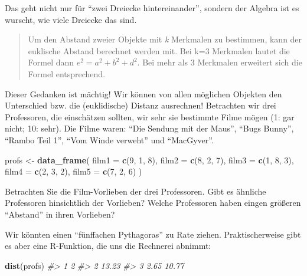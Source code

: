 \documentclass[12pt,ngerman,]{book}
\makeatletter
\newenvironment{Shaded}{\begin{snugshade}}{\end{snugshade}}
\newcommand{\KeywordTok}[1]{\textcolor[rgb]{0.13,0.29,0.53}{\textbf{{#1}}}}
\newcommand{\DataTypeTok}[1]{\textcolor[rgb]{0.13,0.29,0.53}{{#1}}}
\newcommand{\DecValTok}[1]{\textcolor[rgb]{0.00,0.00,0.81}{{#1}}}
\newcommand{\StringTok}[1]{\textcolor[rgb]{0.31,0.60,0.02}{{#1}}}
\newcommand{\CommentTok}[1]{\textcolor[rgb]{0.56,0.35,0.01}{\textit{{#1}}}}
\newcommand{\NormalTok}[1]{{#1}}
\newenvironment{kframe}{%
\medskip{}
\setlength{\fboxsep}{.8em}
 \def\at@end@of@kframe{}%
 \ifinner\ifhmode%
  \def\at@end@of@kframe{\end{minipage}}%
  \begin{minipage}{\columnwidth}%
 \fi\fi%
 \def\FrameCommand##1{\hskip\@totalleftmargin \hskip-\fboxsep
 \colorbox{shadecolor}{##1}\hskip-\fboxsep
     \hskip-\linewidth \hskip-\@totalleftmargin \hskip\columnwidth}%
 \MakeFramed {\advance\hsize-\width
   \@totalleftmargin\z@ \linewidth\hsize
   \@setminipage}}%
 {\par\unskip\endMakeFramed%
 \at@end@of@kframe}
\renewenvironment{Shaded}{\begin{kframe}}{\end{kframe}}
\theoremstyle{definition}
\theoremstyle{definition}
\theoremstyle{remark}
\makeatother
\begin{document}
Das geht nicht nur für ``zwei Dreiecke hintereinander'', sondern der
Algebra ist es wurscht, wie viele Dreiecke das sind.

\begin{quote}
Um den Abstand zweier Objekte mit \emph{k} Merkmalen zu bestimmen, kann
der euklische Abstand berechnet werden mit. Bei k=3 Merkmalen lautet die
Formel dann \(e^2 = a^2 + b^2 + d^2\). Bei mehr als 3 Merkmalen
erweitert sich die Formel entsprechend.
\end{quote}

Dieser Gedanken ist mächtig! Wir können von allen möglichen Objekten den
Unterschied bzw. die (euklidische) Distanz ausrechnen! Betrachten wir
drei Professoren, die einschätzen sollten, wir sehr sie bestimmte Filme
mögen (1: gar nicht; 10: sehr). Die Filme waren: ``Die Sendung mit der
Maus'', ``Bugs Bunny'', ``Rambo Teil 1'', ``Vom Winde verweht'' und
``MacGyver''.

\begin{Shaded}
\begin{Highlighting}[]
\NormalTok{profs <-}\StringTok{ }\KeywordTok{data_frame}\NormalTok{(}
  \DataTypeTok{film1 =} \KeywordTok{c}\NormalTok{(}\DecValTok{9}\NormalTok{, }\DecValTok{1}\NormalTok{, }\DecValTok{8}\NormalTok{),}
  \DataTypeTok{film2 =} \KeywordTok{c}\NormalTok{(}\DecValTok{8}\NormalTok{, }\DecValTok{2}\NormalTok{, }\DecValTok{7}\NormalTok{),}
  \DataTypeTok{film3 =} \KeywordTok{c}\NormalTok{(}\DecValTok{1}\NormalTok{, }\DecValTok{8}\NormalTok{, }\DecValTok{3}\NormalTok{),}
  \DataTypeTok{film4 =} \KeywordTok{c}\NormalTok{(}\DecValTok{2}\NormalTok{, }\DecValTok{3}\NormalTok{, }\DecValTok{2}\NormalTok{),}
  \DataTypeTok{film5 =} \KeywordTok{c}\NormalTok{(}\DecValTok{7}\NormalTok{, }\DecValTok{2}\NormalTok{, }\DecValTok{6}\NormalTok{)}
\NormalTok{)}
\end{Highlighting}
\end{Shaded}

Betrachten Sie die Film-Vorlieben der drei Professoren. Gibt es ähnliche
Professoren hinsichtlich der Vorlieben? Welche Professoren haben eingen
größeren ``Abstand'' in ihren Vorlieben?

Wir könnten einen ``fünffachen Pythagoras'' zu Rate ziehen.
Praktischerweise gibt es aber eine R-Funktion, die uns die Rechnerei
abnimmt:

\begin{Shaded}
\begin{Highlighting}[]
\KeywordTok{dist}\NormalTok{(profs)}
\CommentTok{#>       1     2}
\CommentTok{#> 2 13.23      }
\CommentTok{#> 3  2.65 10.77}
\end{Highlighting}
\end{Shaded}
\end{document}
